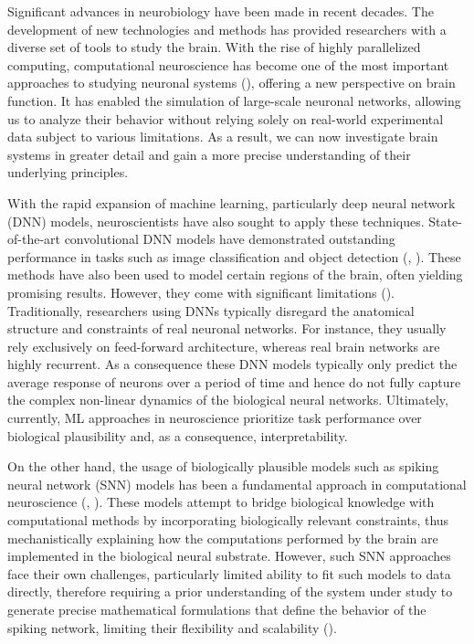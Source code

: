 

Significant advances in neurobiology have been made in recent decades. 
The development of new technologies and
methods has provided researchers with a diverse set of tools to
study the brain. With the rise of highly parallelized computing, 
computational neuroscience has become one of the most important
approaches to studying neuronal systems (\citet{trappenberg2009fundamentals}), 
offering a new perspective on
brain function. It has enabled the simulation of large-scale neuronal
networks, allowing us to analyze their behavior without relying solely
on real-world experimental data subject to various limitations. As a result, we can
now investigate brain systems in greater detail and gain a more precise
understanding of their underlying principles.

With the rapid expansion of machine learning, particularly deep neural
network (DNN) models, neuroscientists have also sought to apply these techniques.
State-of-the-art convolutional DNN models have demonstrated outstanding
performance in tasks such as image classification and object detection
(\citet{krizhevsky2012imagenet}, \citet{li2014medical}). 
These methods have also been used to model certain regions of the brain, often
yielding promising results. However, they come
with significant limitations (\citet{celeghin2023convolutional}).
Traditionally, researchers using DNNs typically disregard the anatomical structure
and constraints of real neuronal networks. For instance, they usually rely exclusively on feed-forward architecture, whereas real brain networks are highly recurrent. As a consequence these DNN models typically only predict the average response of neurons over a period of time and hence do not fully capture the complex non-linear dynamics of the biological neural networks. Ultimately, currently, ML approaches in neuroscience prioritize task performance over biological plausibility and, as a consequence, interpretability.

On the other hand, the usage of biologically plausible models such as
spiking neural network (SNN) models has been a fundamental approach in computational
neuroscience (\citet{ghosh2009spiking}, \citet{yamazaki2022spiking}). 
These models attempt to bridge biological knowledge with computational
methods by incorporating biologically relevant constraints, thus mechanistically explaining how the computations performed by the brain are implemented in the biological neural substrate. However, such SNN approaches face their own challenges, particularly limited ability to fit such models to data directly, therefore requiring a prior understanding of the system under study to generate precise mathematical formulations that define the behavior of the spiking network, limiting their flexibility and scalability (\citet{izhikevich2004model}).

